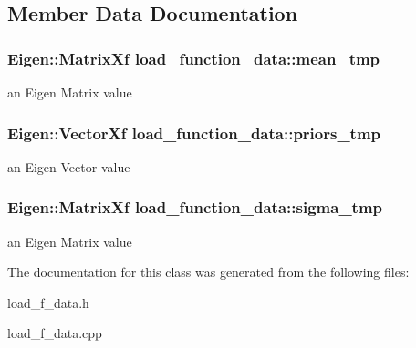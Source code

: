 \subsection{\-Member \-Data \-Documentation}
\hypertarget{classload__function__data_af72443b288b436fe655af0dfbdaeb629}{
\subsubsection[{mean\-\_\-tmp}]{\setlength{\rightskip}{0pt plus 5cm}\-Eigen\-::\-Matrix\-Xf {\bf load\-\_\-function\-\_\-data\-::mean\-\_\-tmp}}}\label{classload__function__data_af72443b288b436fe655af0dfbdaeb629}
an \-Eigen \-Matrix value \hypertarget{classload__function__data_a5aef1ba53e07e962ea81182920ced58e}{
\subsubsection[{priors\-\_\-tmp}]{\setlength{\rightskip}{0pt plus 5cm}\-Eigen\-::\-Vector\-Xf {\bf load\-\_\-function\-\_\-data\-::priors\-\_\-tmp}}}\label{classload__function__data_a5aef1ba53e07e962ea81182920ced58e}
an \-Eigen \-Vector value \hypertarget{classload__function__data_a1b6ac401ce29825822beae148a18f065}{
\subsubsection[{sigma\-\_\-tmp}]{\setlength{\rightskip}{0pt plus 5cm}\-Eigen\-::\-Matrix\-Xf {\bf load\-\_\-function\-\_\-data\-::sigma\-\_\-tmp}}}\label{classload__function__data_a1b6ac401ce29825822beae148a18f065}
an \-Eigen \-Matrix value 

\-The documentation for this class was generated from the following files\-:\begin{DoxyCompactItemize}
\item 
load\-\_\-f\-\_\-data.\-h\item 
load\-\_\-f\-\_\-data.\-cpp\end{DoxyCompactItemize}
